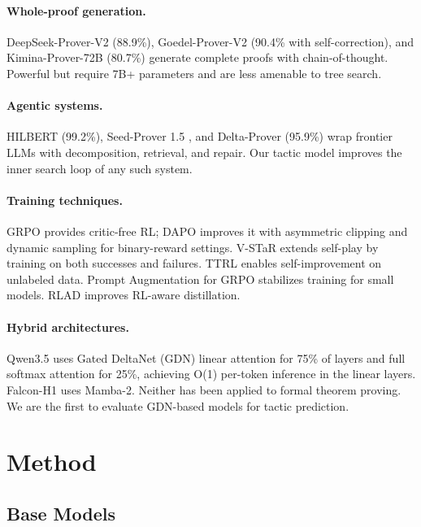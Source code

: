 \documentclass[11pt,a4paper]{article}
\begin{document}
\paragraph{Whole-proof generation.} DeepSeek-Prover-V2 \citep{deepseekprover2} (88.9\%), Goedel-Prover-V2 \citep{goedel} (90.4\% with self-correction), and Kimina-Prover-72B (80.7\%) generate complete proofs with chain-of-thought. Powerful but require 7B+ parameters and are less amenable to tree search.

\paragraph{Agentic systems.} HILBERT \citep{hilbert} (99.2\%), Seed-Prover 1.5 \citep{seedprover15}, and Delta-Prover \citep{deltaprover} (95.9\%) wrap frontier LLMs with decomposition, retrieval, and repair. Our tactic model improves the inner search loop of any such system.

\paragraph{Training techniques.} GRPO \citep{deepseekmath} provides critic-free RL; DAPO \citep{dapo} improves it with asymmetric clipping and dynamic sampling for binary-reward settings. V-STaR \citep{vstar} extends self-play by training on both successes and failures. TTRL \citep{ttrl} enables self-improvement on unlabeled data. Prompt Augmentation for GRPO \citep{promptauggrpo} stabilizes training for small models. RLAD \citep{rlad} improves RL-aware distillation. 
\paragraph{Hybrid architectures.} Qwen3.5 \citep{qwen35} uses Gated DeltaNet (GDN) linear attention for 75\% of layers and full softmax attention for 25\%, achieving O(1) per-token inference in the linear layers. Falcon-H1 \citep{falconh1} uses Mamba-2. Neither has been applied to formal theorem proving. We are the first to evaluate GDN-based models for tactic prediction.

\section{Method}
\label{sec:method}

\subsection{Base Models}
\label{sec:base}
\end{document}
